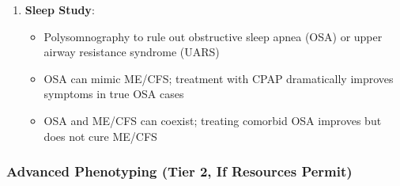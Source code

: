 \begin{enumerate}
    \item \textbf{Sleep Study}:
    \begin{itemize}
        \item Polysomnography to rule out obstructive sleep apnea (OSA) or upper airway resistance syndrome (UARS)
        \item OSA can mimic ME/CFS; treatment with CPAP dramatically improves symptoms in true OSA cases
        \item OSA and ME/CFS can coexist; treating comorbid OSA improves but does not cure ME/CFS
    \end{itemize}
\end{enumerate}

\subsubsection{Advanced Phenotyping (Tier 2, If Resources Permit)}

